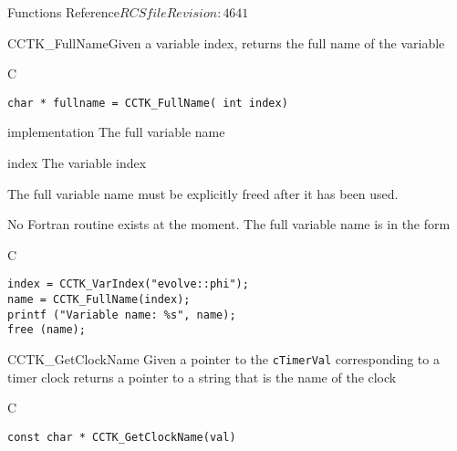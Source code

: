 \begin{cactuspart}{ Functions Reference}{$RCSfile$}{$Revision: 4641 $}
\begin{FunctionDescription}{CCTK\_FullName}{Given a variable index, returns the full name of the variable}
\label{CCTK-FullName}
\begin{SynopsisSection}
\begin{Synopsis}{C}
\begin{verbatim}char * fullname = CCTK_FullName( int index)\end{verbatim}
\end{Synopsis}
\end{SynopsisSection}
\begin{ParameterSection}
\begin{Parameter}{implementation}
The full variable name
\end{Parameter}
\begin{Parameter}{index}
The variable index
\end{Parameter}
\end{ParameterSection}
\begin{Discussion}
The full variable name must be explicitly freed after it has been used.

No Fortran routine exists at the moment. The full variable name is in
the form 
\end{Discussion}
\begin{ExampleSection}
\begin{Example}{C}
\begin{verbatim}
index = CCTK_VarIndex("evolve::phi");
name = CCTK_FullName(index);
printf ("Variable name: %s", name);
free (name);
\end{verbatim}
\end{Example}
\end{ExampleSection}
\end{FunctionDescription}






\begin{FunctionDescription}{CCTK\_GetClockName}
\label{CCTK-GetClockName}
Given a pointer to the {\tt cTimerVal}
corresponding to a timer clock returns a pointer to a string that is
the name of the clock
\begin{SynopsisSection}
\begin{Synopsis}{C}
\begin{verbatim}
const char * CCTK_GetClockName(val)
\end{verbatim}
\end{Synopsis}
\end{SynopsisSection}


\end{FunctionDescription}
\end{cactuspart}
